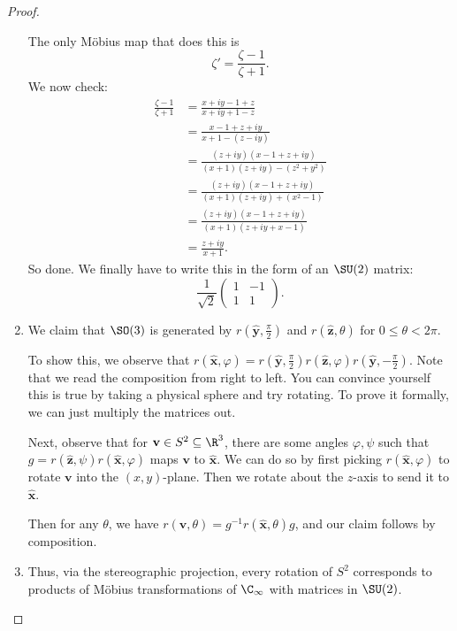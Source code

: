 \documentclass[a4paper]{article}
\begin{document}
\begin{proof}
\begin{enumerate}
\begin{center}
      \end{center}
      The only M\"obius map that does this is
      \[
        \zeta' = \frac{\zeta - 1}{\zeta + 1}.
      \]
      We now check:
      \begin{align*}
        \frac{\zeta - 1}{\zeta + 1} &= \frac{x + iy - 1 + z}{x + iy + 1 - z}\\
        &= \frac{x - 1 + z + iy}{x + 1 - (z - iy)}\\
        &= \frac{(z + iy)(x - 1 + z + iy)}{(x + 1)(z + iy) - (z^2 + y^2)}\\
        &= \frac{(z + iy)(x - 1 + z + iy)}{(x + 1)(z + iy) + (x^2 - 1)}\\
        &= \frac{(z + iy)(x - 1 + z + iy)}{(x + 1)(z + iy + x - 1)}\\
        &= \frac{z + iy}{x + 1}.
      \end{align*}
      So done. We finally have to write this in the form of an $\SU(2)$ matrix:
      \[
        \frac{1}{\sqrt{2}}
        \begin{pmatrix}
          1 & -1\\
          1 & 1
        \end{pmatrix}.
      \]
    \item We claim that $\SO(3)$ is generated by $r\left(\hat{\mathbf{y}}, \frac{\pi}{2}\right)$ and $r(\hat{\mathbf{z}}, \theta)$ for $0 \leq \theta < 2\pi$.

      To show this, we observe that $r(\hat{\mathbf{x}}, \varphi) = r(\hat{\mathbf{y}}, \frac{\pi}{2}) r(\hat{\mathbf{z}}, \varphi) r(\hat{\mathbf{y}}, -\frac{\pi}{2})$. Note that we read the composition from right to left. You can convince yourself this is true by taking a physical sphere and try rotating. To prove it formally, we can just multiply the matrices out.

      Next, observe that for $\mathbf{v} \in S^2 \subseteq \R^3$, there are some angles $\varphi, \psi$ such that $g = r(\hat{\mathbf{z}}, \psi) r(\hat{\mathbf{x}}, \varphi)$ maps $\mathbf{v}$ to $\hat{\mathbf{x}}$. We can do so by first picking $r(\hat{\mathbf{x}}, \varphi)$ to rotate $\mathbf{v}$ into the $(x, y)$-plane. Then we rotate about the $z$-axis to send it to $\hat{\mathbf{x}}$.

      Then for any $\theta$, we have $r(\mathbf{v}, \theta) = g^{-1} r(\hat{\mathbf{x}}, \theta) g$, and our claim follows by composition.
    \item Thus, via the stereographic projection, every rotation of $S^2$ corresponds to products of M\"obius transformations of $\C_\infty$ with matrices in $\SU(2)$.\qedhere
  \end{enumerate}
\end{proof}
\end{document}
